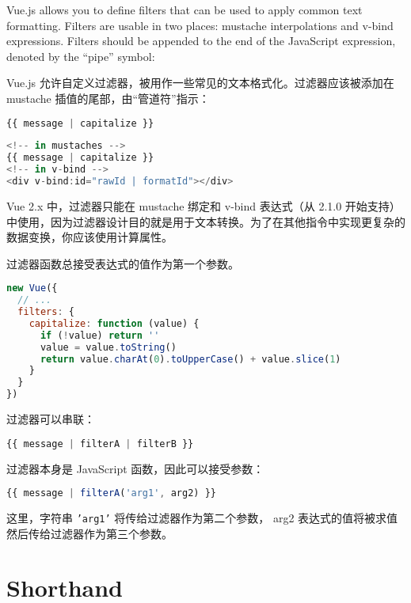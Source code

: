 Vue.js allows you to define filters that can be used to apply common text formatting. Filters are usable in two places: mustache interpolations and v-bind expressions. Filters should be appended to the end of the JavaScript expression, denoted by the “pipe” symbol:

Vue.js 允许自定义过滤器，被用作一些常见的文本格式化。过滤器应该被添加在 mustache 插值的尾部，由“管道符”指示：


\begin{lstlisting}[language=JavaScript]
{{ message | capitalize }}
\end{lstlisting}




\begin{lstlisting}[language=JavaScript]
<!-- in mustaches -->
{{ message | capitalize }}
<!-- in v-bind -->
<div v-bind:id="rawId | formatId"></div>
\end{lstlisting}


Vue 2.x 中，过滤器只能在 mustache 绑定和 v-bind 表达式（从 2.1.0 开始支持）中使用，因为过滤器设计目的就是用于文本转换。为了在其他指令中实现更复杂的数据变换，你应该使用计算属性。

过滤器函数总接受表达式的值作为第一个参数。



\begin{lstlisting}[language=JavaScript]
new Vue({
  // ...
  filters: {
    capitalize: function (value) {
      if (!value) return ''
      value = value.toString()
      return value.charAt(0).toUpperCase() + value.slice(1)
    }
  }
})
\end{lstlisting}



过滤器可以串联：

\begin{lstlisting}[language=JavaScript]
{{ message | filterA | filterB }}
\end{lstlisting}

过滤器本身是 JavaScript 函数，因此可以接受参数：

\begin{lstlisting}[language=JavaScript]
{{ message | filterA('arg1', arg2) }}
\end{lstlisting}

这里，字符串 \texttt{'arg1'} 将传给过滤器作为第二个参数， arg2 表达式的值将被求值然后传给过滤器作为第三个参数。



\section{Shorthand}


